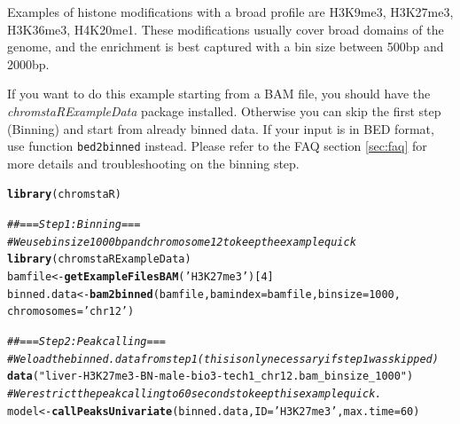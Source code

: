 \documentclass[11pt]{article}\usepackage[]{graphicx}\usepackage[]{color}
\makeatletter
\newcommand{\hlnum}[1]{\textcolor[rgb]{0.686,0.059,0.569}{#1}}%
\newcommand{\hlstr}[1]{\textcolor[rgb]{0.192,0.494,0.8}{#1}}%
\newcommand{\hlcom}[1]{\textcolor[rgb]{0.678,0.584,0.686}{\textit{#1}}}%
\newcommand{\hlstd}[1]{\textcolor[rgb]{0.345,0.345,0.345}{#1}}%
\newcommand{\hlkwb}[1]{\textcolor[rgb]{0.69,0.353,0.396}{#1}}%
\newcommand{\hlkwc}[1]{\textcolor[rgb]{0.333,0.667,0.333}{#1}}%
\newcommand{\hlkwd}[1]{\textcolor[rgb]{0.737,0.353,0.396}{\textbf{#1}}}%
\newenvironment{kframe}{%
 \def\at@end@of@kframe{}%
 \ifinner\ifhmode%
  \def\at@end@of@kframe{\end{minipage}}%
  \begin{minipage}{\columnwidth}%
 \fi\fi%
 \def\FrameCommand##1{\hskip\@totalleftmargin \hskip-\fboxsep
 \colorbox{shadecolor}{##1}\hskip-\fboxsep
     \hskip-\linewidth \hskip-\@totalleftmargin \hskip\columnwidth}%
 \MakeFramed {\advance\hsize-\width
   \@totalleftmargin\z@ \linewidth\hsize
   \@setminipage}}%
 {\par\unskip\endMakeFramed%
 \at@end@of@kframe}
\newenvironment{knitrout}{}{} %
\newcommand{\Rfunction}[1]{{\texttt{#1}}}
\newcommand{\Rpackage}[1]{{\textit{#1}}}
\makeatother
\begin{document}
Examples of histone modifications with a broad profile are H3K9me3, H3K27me3, H3K36me3, H4K20me1. These modifications usually cover broad domains of the genome, and the enrichment is best captured with a bin size between 500bp and 2000bp.

If you want to do this example starting from a BAM file, you should have the \Rpackage{chromstaRExampleData} package installed. Otherwise you can skip the first step (Binning) and start from already binned data. If your input is in BED format, use function \Rfunction{bed2binned} instead. Please refer to the FAQ section \ref{sec:faq} for more details and troubleshooting on the binning step.

\begin{scriptsize}
\begin{knitrout}
\color{fgcolor}\begin{kframe}
\begin{alltt}
\hlkwd{library}\hlstd{(chromstaR)}
\end{alltt}
\end{kframe}
\end{knitrout}

\begin{knitrout}
\color{fgcolor}\begin{kframe}
\begin{alltt}
\hlcom{## === Step 1: Binning ===}
\hlcom{# We use bin size 1000bp and chromosome 12 to keep the example quick}
\hlkwd{library}\hlstd{(chromstaRExampleData)}
\hlstd{bamfile} \hlkwb{<-} \hlkwd{getExampleFilesBAM}\hlstd{(}\hlstr{'H3K27me3'}\hlstd{)[}\hlnum{4}\hlstd{]}
\hlstd{binned.data} \hlkwb{<-} \hlkwd{bam2binned}\hlstd{(bamfile,} \hlkwc{bamindex}\hlstd{=bamfile,} \hlkwc{binsize}\hlstd{=}\hlnum{1000}\hlstd{,}
                          \hlkwc{chromosomes}\hlstd{=}\hlstr{'chr12'}\hlstd{)}
\end{alltt}
\end{kframe}
\end{knitrout}

\begin{knitrout}
\color{fgcolor}\begin{kframe}
\begin{alltt}
\hlcom{## === Step 2: Peak calling ===}
\hlcom{# We load the binned.data from step 1 (this is only necessary if step 1 was skipped)}
\hlkwd{data}\hlstd{(}\hlstr{"liver-H3K27me3-BN-male-bio3-tech1_chr12.bam_binsize_1000"}\hlstd{)}
\hlcom{# We restrict the peak calling to 60 seconds to keep this example quick.}
\hlstd{model} \hlkwb{<-} \hlkwd{callPeaksUnivariate}\hlstd{(binned.data,} \hlkwc{ID}\hlstd{=}\hlstr{'H3K27me3'}\hlstd{,} \hlkwc{max.time}\hlstd{=}\hlnum{60}\hlstd{)}
\end{alltt}



\end{kframe}
\end{knitrout}
\end{scriptsize}
\end{document}
